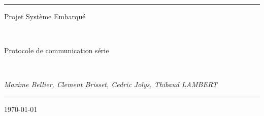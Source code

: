 \documentclass[a4paper,10pt]{article}
\begin{document}
\noindent{}
\rule{\textwidth}{1pt}
\begin{flushright}
  {\Huge Projet Système Embarqué}

~

  {\Large Protocole de communication série}

~

  {\large \textit{ Maxime Bellier, Clement Brisset, Cedric Jolys, Thibaud LAMBERT }}
\end{flushright}
\rule{\textwidth}{1pt}
\thispagestyle{empty}
\begin{flushright} \today \end{flushright}

\newpage

\tableofcontents

\newpage



\newpage
\end{document}
